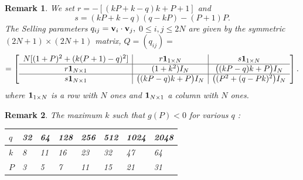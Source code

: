 \documentclass{amsart}
\newtheorem{remark}{Remark}[section]
\numberwithin{equation}{section}
\begin{document}
\begin{remark}
We set $r = - [(kP+k-q)k+P+1]$ and $$s=(kP+k-q)(q-kP)-(P+1)P.$$ 
The Selling parameters $q_{ij}={\textbf v}_i\cdot {\textbf v}_j,$ $0\le i,j\le 2N$ are given by the symmetric $(2N+1)\times (2N+1)$ matrix, $Q=(q_{ij})=$
$$=\left[\begin{array}{c|c|c}
N[(1+P)^2+(k(P+1)-q)^2] & r{\textbf 1}_{1\times N}  & s{\textbf 1}_{1\times N} \\
\hline
r{\textbf 1}_{N\times 1}  & (1+k^2)I_N & \big((kP-q)k+P\big)I_N  \\
\hline
s{\textbf 1}_{N\times 1} &  \big((kP-q)k+P\big)I_N & \big((P^2+(q-Pk)^2\big)I_N   \\
\end{array}\right].
$$
where ${\textbf 1}_{1\times N}$ is a row with $N$ ones and ${\textbf 1}_{N\times 1}$ a column with $N$ ones.

\end{remark}
\begin{remark}
The maximum $k$ such that $g(P)<0$ for various $q$ :

\begin{table}[h]

\begin{tabular}{|l||l|l|l|l|l|l|l|}
\hline 
$q$ & 32 & 64 & 128 & 256 & 512 & 1024 &2048\\ \hline
$k$ & 8 & 11 & 16 & 23 & 32 & 47 & 64 \\ \hline
$P$ & 3 & 5 & 7 & 11 & 15 & 21 & 31 \\  \hline
\end{tabular}
\label{Tab:1}
\end{table} 

\end{remark}
\end{document}
